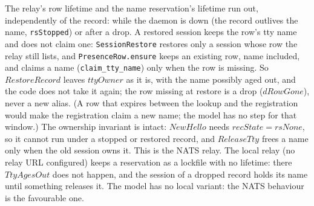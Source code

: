 \documentclass[a4paper,10pt,fleqn]{article}
\begin{document}
The relay's row lifetime and the name reservation's lifetime run out, independently of the record: while the
daemon is down (the record outlives the name, \texttt{rsStopped}) or after a drop.  A restored session keeps the row's
tty name and does not claim one: \texttt{SessionRestore} restores only a session whose row the relay still lists, and
\texttt{PresenceRow.ensure} keeps an existing row, name included, and claims a name
(\texttt{claim\_tty\_name}) only when the row is missing.  So $RestoreRecord$ leaves $ttyOwner$ as it is, with the
name possibly aged out, and the code does not take it again; the row missing at restore is a drop
($dRowGone$), never a new alias.  (A row that expires between the lookup and the registration would make
the registration claim a new name; the model has no step for that window.)  The ownership invariant is
intact: $NewHello$ needs $recState = rsNone$, so it cannot run under a stopped or restored record, and
$ReleaseTty$ frees a name only when the old session owns it.  This is the
NATS relay.  The local relay (no relay URL configured) keeps a reservation as a
lockfile with no lifetime: there $TtyAgesOut$ does not happen, and the session of a dropped
record holds its name until something releases it.  The model has no local
variant: the NATS behaviour is the favourable one.
\end{document}
